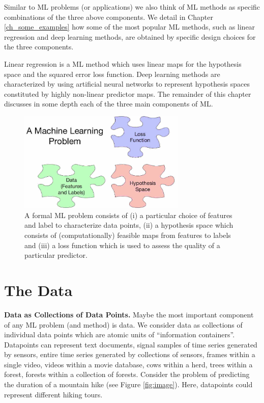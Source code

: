 \documentclass[12pt]{report}
\begin{document}
Similar to ML problems (or applications) we also think of ML 
methods as specific combinations of the three above components. 
We detail in Chapter \ref{ch_some_examples} how some of the 
most popular ML methods, such as linear regression and deep 
learning methods, are obtained by specific design choices for 
the three components. 

Linear regression is a ML method which uses linear maps for 
the hypothesis space and the squared error loss function. 
Deep learning methods are characterized by using artificial 
neural networks to represent hypothesis spaces constituted 
by highly non-linear predictor maps. The remainder of this 
chapter discusses in some depth each of the three main 
components of ML. 

\begin{figure}[htbp]
\begin{center}
    \includegraphics[width=8cm]{AMLProblem1.jpg}  
\end{center} 
\caption{A formal ML problem consists of (i) a particular choice of features and 
	label to characterize data points, (ii) a hypothesis space which consists of 
	(computationally) feasible maps from features to labels and (iii) a loss function 
	which is used to assess the quality of a particular predictor.}
\label{fig_ml_problem}
\end{figure}

\section{The Data}
\label{sec_the_data}

{\bf Data as Collections of Data Points.} Maybe the most important component of any 
ML problem (and method) is data. We consider data as collections of 
individual data points which are atomic units of ``information containers''. Datapoints 
can represent text documents, signal samples of time series generated by sensors, 
entire time series generated by collections of sensors, frames within a single video, 
videos within a movie database, cows within a herd, trees within a forest, forests 
within a collection of forests. Consider the problem of predicting the duration 
of a mountain hike (see Figure \ref{fig:image}). Here, datapoints could represent 
different hiking tours.  
\end{document}

